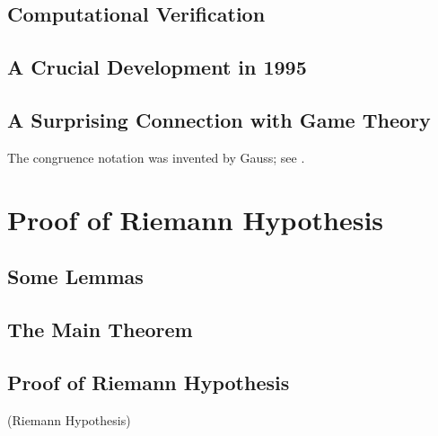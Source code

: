 \section{Computational Verification}

\lipsum[1-2]

\section{A Crucial Development in 1995}

\lipsum[3-5]

\section{A Surprising Connection with Game Theory}
\lipsum[3-5]

The congruence 
notation was invented by Gauss; see \cite{da}.

\chapter{Proof of Riemann Hypothesis}

\section{Some Lemmas}

\lipsum[1]

\begin{lem}
\lipsum[2]
\end{lem}

\begin{lem}
\lipsum[3]
\end{lem}

\begin{lem}
\lipsum[4]
\end{lem}

\lipsum[5]

\section{The Main Theorem}

\lipsum[4]

\begin{thm}
\lipsum[5]
\end{thm}

\lipsum[6]

\section{Proof of Riemann Hypothesis}

\lipsum[7]

\begin{cor} (Riemann Hypothesis)
\lipsum[8]
\end{cor}

\lipsum[9]


